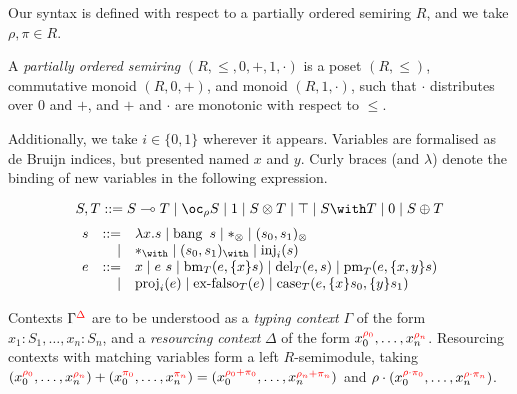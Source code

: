Our syntax is defined with respect to a partially ordered semiring $R$, and we take $\rho,\pi \in R$.

\begin{definition}
  A \emph{partially ordered semiring} $(R, \leq, 0, +, 1 , \cdot)$ is a poset $(R, \leq)$, commutative monoid $(R, 0, +)$, and monoid $(R, 1, \cdot)$, such that $\cdot$ distributes over $0$ and $+$, and $+$ and $\cdot$ are monotonic with respect to $\leq$.
\end{definition}

Additionally, we take $i \in \{0,1\}$ wherever it appears.
Variables are formalised as de Bruijn indices, but presented named $x$ and $y$.
Curly braces (and $\lambda$) denote the binding of new variables in the following expression.

\begin{displaymath}
  S,T ::= \fun{S}{T} \mid \excl{\rho}{S} \mid \tensorOne \mid \tensor{S}{T} \mid \withTOne \mid \withT{S}{T} \mid \sumTZero \mid \sumT{S}{T}
\end{displaymath}
\begin{displaymath}
  \begin{array}{rrll}
    s &  ::= & \lam{x}{s} \mid \bang{s} \mid \unit \mid \ten{s_0}{s_1} \\
      & \mid & \eat \mid \wth{s_0}{s_1} \mid \inj{i}{s} \\
    e &  ::= & x \mid \app{e}{s} \mid \bm{T}{e}{\bind{x}{s}} \mid \del{T}{e}{s} \mid \prm{T}{e}{\bind{x,y}{s}} \\
      & \mid & \proj{i}{e} \mid \exf{T}{e} \mid \cse{T}{e}{\bind{x}{s_0}}{\bind{y}{s_1}}
  \end{array}
\end{displaymath}

Contexts $\Gamma^{\color{red}\Delta}$ are to be understood as a \emph{typing context} $\Gamma$ of the form $x_1 : S_1, \ldots, x_n : S_n$, and a \emph{resourcing context} $\Delta$ of the form $x_0^{{\color{red}\rho_0}}, \ldots, x_n^{{\color{red}\rho_n}}$.
Resourcing contexts with matching variables form a left $R$-semimodule, taking $(x_0^{{\color{red}\rho_0}}, \ldots, x_n^{{\color{red}\rho_n}}) + (x_0^{{\color{red}\pi_0}}, \ldots, x_n^{{\color{red}\pi_n}}) = (x_0^{{\color{red}\rho_0 + \pi_0}}, \ldots, x_n^{{\color{red}\rho_n + \pi_n}})$ and $\rho \cdot (x_0^{{\color{red}\rho \cdot \pi_0}}, \ldots, x_n^{{\color{red}\rho \cdot \pi_n}})$.

